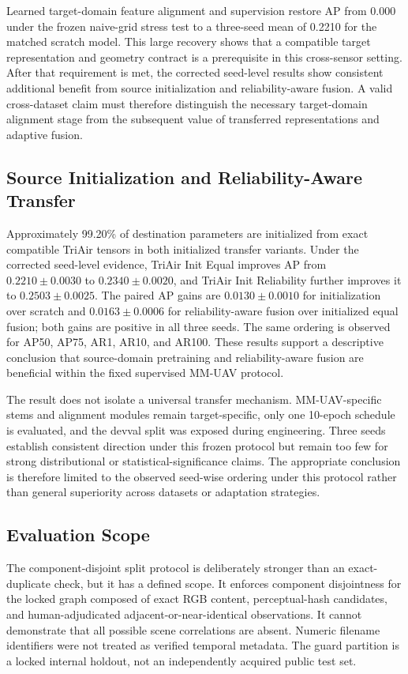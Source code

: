 Learned target-domain feature alignment and supervision restore AP from 0.000 under the frozen naive-grid stress test to a three-seed mean of 0.2210 for the matched scratch model. This large recovery shows that a compatible target representation and geometry contract is a prerequisite in this cross-sensor setting. After that requirement is met, the corrected seed-level results show consistent additional benefit from source initialization and reliability-aware fusion. A valid cross-dataset claim must therefore distinguish the necessary target-domain alignment stage from the subsequent value of transferred representations and adaptive fusion.

\subsection{Source Initialization and Reliability-Aware Transfer}
Approximately 99.20\% of destination parameters are initialized from exact compatible TriAir tensors in both initialized transfer variants. Under the corrected seed-level evidence, TriAir Init Equal improves AP from $0.2210\pm0.0030$ to $0.2340\pm0.0020$, and TriAir Init Reliability further improves it to $0.2503\pm0.0025$. The paired AP gains are $0.0130\pm0.0010$ for initialization over scratch and $0.0163\pm0.0006$ for reliability-aware fusion over initialized equal fusion; both gains are positive in all three seeds. The same ordering is observed for AP50, AP75, AR1, AR10, and AR100. These results support a descriptive conclusion that source-domain pretraining and reliability-aware fusion are beneficial within the fixed supervised MM-UAV protocol.

The result does not isolate a universal transfer mechanism. MM-UAV-specific stems and alignment modules remain target-specific, only one 10-epoch schedule is evaluated, and the devval split was exposed during engineering. Three seeds establish consistent direction under this frozen protocol but remain too few for strong distributional or statistical-significance claims. The appropriate conclusion is therefore limited to the observed seed-wise ordering under this protocol rather than general superiority across datasets or adaptation strategies.

\subsection{Evaluation Scope}
The component-disjoint split protocol is deliberately stronger than an exact-duplicate check, but it has a defined scope. It enforces component disjointness for the locked graph composed of exact RGB content, perceptual-hash candidates, and human-adjudicated adjacent-or-near-identical observations. It cannot demonstrate that all possible scene correlations are absent. Numeric filename identifiers were not treated as verified temporal metadata. The guard partition is a locked internal holdout, not an independently acquired public test set.

